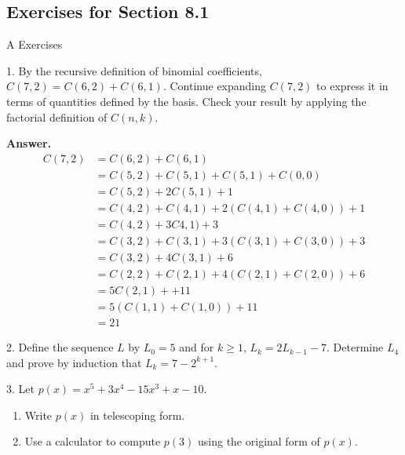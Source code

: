 \documentclass[10pt,]{book}
\theoremstyle{plain}
\theoremstyle{definition}
\theoremstyle{definition}
\theoremstyle{definition}
\theoremstyle{definition}
\numberwithin{equation}{section}
\begin{document}
\subsection[Exercises for Section 8.1]{Exercises for Section 8.1}\label{exercises-1}
\hypertarget{exercisegroup-1}{}\typeout{************************************************}
\typeout{************************************************}
A Exercises%
\begin{exercisegroup}
\item[1.]\hypertarget{exercise-1}{}By the recursive definition of binomial coefficients, \(C(7, 2) = C(6, 2) + C(6, 1)\). Continue expanding \(C(7, 2)\) to express it in terms of quantities defined by the basis. Check your result by applying the factorial definition of \(C(n, k)\).%
\par\smallskip
\par\smallskip
\noindent\textbf{Answer.}\hypertarget{answer-1}{}\quad
\begin{equation*}
\begin{split}
 C(7,2)&=C(6,2)+C(6,1)\\
	&=C(5,2)+C(5,1)+C(5,1)+C(0,0)\\
&=C(5,2)+2 C(5,1)+1\\
&=C(4,2)+C(4,1)+2(C(4,1)+C(4,0))+1\\
&=C(4,2)+3 C4,1) + 3\\
&=C(3,2)+C(3,1)+3(C(3,1)+C(3,0))+3\\
&=C(3,2)+4 C(3,1) + 6\\
&=C(2,2)+C(2,1)+ 4(C(2,1)+C(2,0)) + 6\\
&=5 C(2,1)+ + 11\\
&=5(C(1,1)+C(1,0)) + 11\\
&=21
\end{split}
\end{equation*}
%
\item[2.]\hypertarget{exercise-2}{} Define the sequence \(L\) by \(L_0 = 5\) and for \(k\geq 1\), \(L _k = 2L_{k-1}-7\).  Determine \(L_4\) and prove
by induction that \(L_k=7-2^{k+1}\).%
\par\smallskip
\item[3.]\hypertarget{exercise-3}{} Let \(p(x) = x^5+ 3x^4 - 15x^3 + x - 10\).%
\par
\leavevmode%
\begin{enumerate}[label=\alph*]
\item\hypertarget{li-8}{} Write \(p(x)\) in telescoping form.%
\item\hypertarget{li-9}{} Use a calculator to compute \(p(3)\) using the original form of \(p(x)\). %

\end{enumerate}
\end{exercisegroup}
\end{document}
